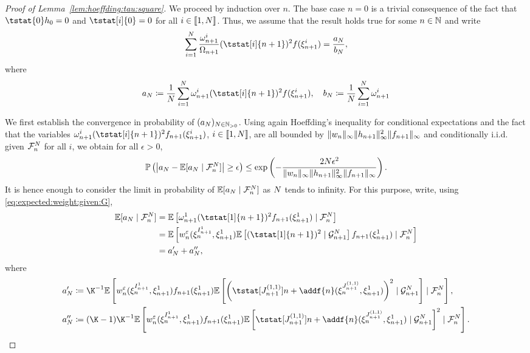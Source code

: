 \begin{proof}[Proof of Lemma~\ref{lem:hoeffding:tau:square}]
We proceed by induction over $n$. The base case $n = 0$ is a trivial consequence of the fact that $\tstat{0} h_0 = 0$ and $\tstat[i]{0} = 0$ for all $i \in \llbracket 1, N \rrbracket$. Thus, we assume that the result holds true for some $n \in \mathbb{N}$ and write
\[
\sum_{i=1}^\N \frac{\ewght{n+1}{i}}{\sumwght{n+1}}(\tstat[i]{n+1})^2 f(\epart{n+1}{i}) = \frac{a_\N}{b_\N},
\]
where 
$$
a_\N \eqdef \frac{1}{\N}\sum_{i=1}^N\ewght{n+1}{i}(\tstat[i]{n+1})^2 f(\epart{n+1}{i}), \quad b_\N \eqdef \frac{1}{\N} \sum_{i=1}^N \ewght{n+1}{i}
$$

We first establish the convergence in probability of $(a_N)_{N \in \mathbb{N}_{> 0}}$. Using again Hoeffding's inequality for conditional expectations and the fact that the variables $\ewght{n+1}{i}(\tstat[i]{n + 1})^2 f_{n + 1}(\epart{n + 1}{i})$, $i \in \llbracket 1, N \rrbracket$, are all bounded by $\| w_{n} \|_\infty \| h_{n + 1} \|^2_\infty \| f_{n + 1}\|_\infty$ and conditionally i.i.d. given $\mathcal{F}_{n}^{N}$ for all $i$, we obtain for all $\epsilon > 0$,  
\[
\mathbb{P}\left(\left| a_N - \mathbb{E}[a_N \mid \mathcal{F}_{n}^{N}] \right| \geq \epsilon \right) \leq \exp \left( - \frac{2 N \epsilon^2}{\| w_{n} \|_\infty \| h_{n + 1} \|^2_\infty \| f_{n+1} \|_\infty} \right). 
\]
It is hence enough to consider the limit in probability of $\mathbb{E}[a_N \mid \mathcal{F}_{n}^{N}]$ as $N$ tends to infinity. For this purpose, write, using \eqref{eq:expected:weight:given:G}, 
\begin{align*}
\pE[a_\N \mid \calF{n}{\N}] &= \pE \left[ \ewght{n + 1}{1}(\tstat[1]{n + 1})^2 f_{n+1}(\epart{n + 1}{1}) \mid  \calF{n}{\N} \right] \\ 
&= \pE\left[\wgtfuncmod{n}(\epart{n}{\ind{n + 1}{1}}, \epart{n + 1}{1}) \pE \left[(\tstat[1]{n + 1})^2 \cond \calG{n + 1}{\N}\right] f_{n + 1}(\epart{n + 1}{1}) \cond \calF{n}{\N} \right] \\
&= a_\N' + a_\N'',
\end{align*}
where
\begin{align*}
a_\N' &\eqdef \K^{-1}\pE\left[ \wgtfuncmod{n}(\epart{n}{\ind{n + 1}{1}}, \epart{n + 1}{1}) f_{n + 1}(\epart{n + 1}{1}) \pE \left[ \left( \tstat[J_{n + 1}^{(1,1)}]{n} + \addf{n}(\epart{n}{J_{n + 1}^{(1,1)}}, \epart{n + 1}{1}) \right)^2 \cond \calG{n + 1}{\N}\right] \cond \calF{n}{\N} \right], \\
a_\N'' &\eqdef (\K - 1)\K^{-1} \pE \left[ \wgtfuncmod{n}(\epart{n}{\ind{n + 1}{1}}, \epart{n + 1}{1}) f_{n + 1}(\epart{n + 1}{1}) \pE \left[\tstat[J_{n + 1}^{(1,1)}]{n} + \addf{n}(\epart{n}{J_{n + 1}^{(1,1)}}, \epart{n + 1}{1}) \cond \calG{n + 1}{\N}\right]^2 \cond \calF{n}{\N} \right]. 

\end{align*}
\end{proof}
